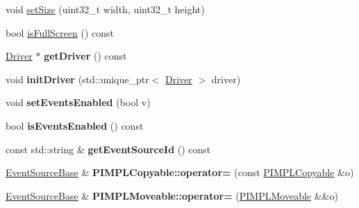 \begin{DoxyCompactItemize}
\item 
void \hyperlink{a00082_aefaae1015e22521e0a0168633a7d413f}{set\+Size} (uint32\+\_\+t width, uint32\+\_\+t height)
\item 
bool \hyperlink{a00082_a9429ac0c042cc998ecbedb1c13c0bc9a}{is\+Full\+Screen} () const 
\item 
\hyperlink{a00024}{Driver} $\ast$ {\bfseries get\+Driver} () const \hypertarget{a00082_ac793b7cdbbdd1d62df9dc64e4ed50b27}{}\label{a00082_ac793b7cdbbdd1d62df9dc64e4ed50b27}

\item 
void {\bfseries init\+Driver} (std\+::unique\+\_\+ptr$<$ \hyperlink{a00024}{Driver} $>$ driver)\hypertarget{a00082_a23c30f984006bdf0d2ceda4513ee12b9}{}\label{a00082_a23c30f984006bdf0d2ceda4513ee12b9}

\item 
void {\bfseries set\+Events\+Enabled} (bool v)\hypertarget{a00036_ae529242181c16462bef9bd6b8fb56b93}{}\label{a00036_ae529242181c16462bef9bd6b8fb56b93}

\item 
bool {\bfseries is\+Events\+Enabled} () const \hypertarget{a00036_a659325f18d666f132f380e4319499572}{}\label{a00036_a659325f18d666f132f380e4319499572}

\item 
const std\+::string \& {\bfseries get\+Event\+Source\+Id} () const \hypertarget{a00036_ad41deeb2b9de38797b10777e5d1ecf13}{}\label{a00036_ad41deeb2b9de38797b10777e5d1ecf13}

\item 
\hyperlink{a00036}{Event\+Source\+Base} \& {\bfseries P\+I\+M\+P\+L\+Copyable\+::operator=} (const \hyperlink{a00060}{P\+I\+M\+P\+L\+Copyable} \&o)\hypertarget{a00060_a26fdb9b3d449d04dc653c7ae942f452b}{}\label{a00060_a26fdb9b3d449d04dc653c7ae942f452b}

\item 
\hyperlink{a00036}{Event\+Source\+Base} \& {\bfseries P\+I\+M\+P\+L\+Moveable\+::operator=} (\hyperlink{a00061}{P\+I\+M\+P\+L\+Moveable} \&\&o)\hypertarget{a00061_ac67025e8a25edffe99fa9bf67ed8ca19}{}\label{a00061_ac67025e8a25edffe99fa9bf67ed8ca19}

\end{DoxyCompactItemize}
